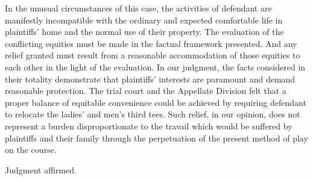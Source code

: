 In the unusual circumstances of this case, the activities of defendant are
manifestly incompatible with the ordinary and expected comfortable life in
plaintiffs' home and the normal use of their property. The evaluation of the
conflicting equities must be made in the factual framework presented. And any
relief granted must result from a reasonable accommodation of those equities to
each other in the light of the evaluation. In our judgment, the facts considered
in their totality demonstrate that plaintiffs' interests are paramount and
demand reasonable protection. The trial court and the Appellate Division felt
that a proper balance of equitable convenience could be achieved by requiring
defendant to relocate the ladies' and men's third tees. Such relief, in our
opinion, does not represent a burden disproportionate to the travail which would
be suffered by plaintiffs and their family through the perpetuation of the
present method of play on the course.

Judgment affirmed.

